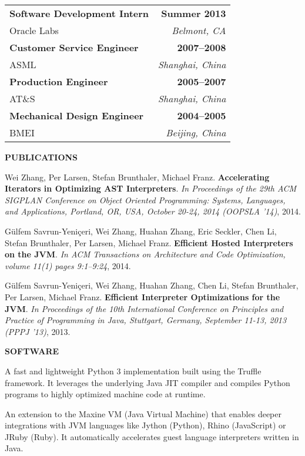 {\begin{tabular*}{1\textwidth}{@{\extracolsep{\fill}}lr}
    \textbf{Software Development Intern} & \textbf{Summer 2013} \\
    \vspace{6pt}
    Oracle Labs & \emph{Belmont, CA} \\

    \textbf{Customer Service Engineer} & \textbf{2007--2008} \\
    \vspace{6pt}
    ASML & \emph{Shanghai, China} \\

    \textbf{Production Engineer} & \textbf{2005--2007} \\
    \vspace{6pt}
    AT\&S & \emph{Shanghai, China} \\

    \textbf{Mechanical Design Engineer} & \textbf{2004--2005} \\
    \vspace{6pt}
    BMEI & \emph{Beijing, China} \\
  \end{tabular*}

\pagebreak

\textbf{PUBLICATIONS}


Wei Zhang, Per Larsen, Stefan Brunthaler, Michael Franz.
\textbf{Accelerating Iterators in Optimizing AST Interpreters}.
\textit{In Proceedings of the 29th ACM SIGPLAN Conference on Object Oriented Programming:
Systems, Languages, and Applications, Portland, OR, USA, October 20-24, 2014 (OOPSLA '14)}, 2014.

G{\"u}lfem Savrun-Yeniçeri, Wei Zhang, Huahan Zhang, Eric Seckler, Chen Li, Stefan Brunthaler,
Per Larsen, Michael Franz.
\textbf{Efficient Hosted Interpreters on the JVM}.
\textit{In ACM Transactions on Architecture and Code Optimization, volume 11(1) pages 9:1–9:24}, 2014.

G{\"u}lfem Savrun-Yeniçeri, Wei Zhang, Huahan Zhang, Chen Li, Stefan Brunthaler, Per Larsen, Michael Franz.
\textbf{Efficient Interpreter Optimizations for the JVM}.
\textit{In Proceedings of the 10th International Conference on Principles and Practice of Programming in Java,
Stuttgart, Germany, September 11-13, 2013 (PPPJ '13)}, 2013.

\vspace{12pt}
\textbf{SOFTWARE}

{A fast and lightweight Python 3 implementation built using the Truffle framework.
It leverages the underlying Java JIT compiler and compiles Python programs to highly optimized machine code at runtime.}

{An extension to the Maxine VM (Java Virtual Machine) that enables deeper integrations with JVM languages
like Jython (Python), Rhino (JavaScript) or JRuby (Ruby). It automatically accelerates guest language interpreters written in Java.}

}

